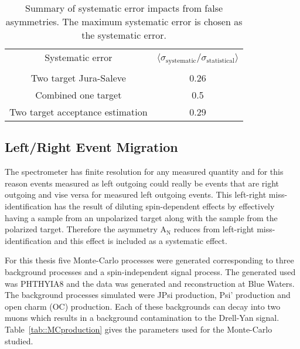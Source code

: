 \begin{table}[h!t]
  \centering
  \begin{tabular}{|c|c|}
    \hline Systematic error& \multirow{2}{9em}{$\langle
      \sigma_{\mathrm{systematic}}/\sigma_{\mathrm{statistical}}
      \rangle$}\\ & \\ \hline
    
    Two target Jura-Saleve& 0.26\\ \hline

    Combined one target& 0.5\\ \hline

    Two target acceptance estimation& 0.29\\ \hline
    
  \end{tabular}
  \caption{Summary of systematic error impacts from false asymmetries.  The
    maximum systematic error is chosen as the systematic error.}
  \label{tab::faSys}
\end{table}


\subsection{Left/Right Event Migration}
The spectrometer has finite resolution for any measured quantity and for this
reason events measured as left outgoing could really be events that are right
outgoing and vise versa for measured left outgoing events.  This left-right
miss-identification has the result of diluting spin-dependent effects by
effectively having a sample from an unpolarized target along with the sample
from the polarized target.  Therefore the asymmetry A$_{\mathrm{N}}$ reduces
from left-right miss-identification and this effect is included as a systematic
effect. \par

For this thesis five Monte-Carlo processes were generated corresponding to three
background processes and a spin-independent signal process.  The generated used
was PHTHYIA8 and the data was generated and reconstruction at Blue Waters.  The
background processes simulated were JPsi production, Psi' production and open
charm (OC) production.  Each of these backgrounds can decay into two muons which
results in a background contamination to the Drell-Yan signal.
Table~\ref{tab::MCproduction} gives the parameters used for the Monte-Carlo
studied.

